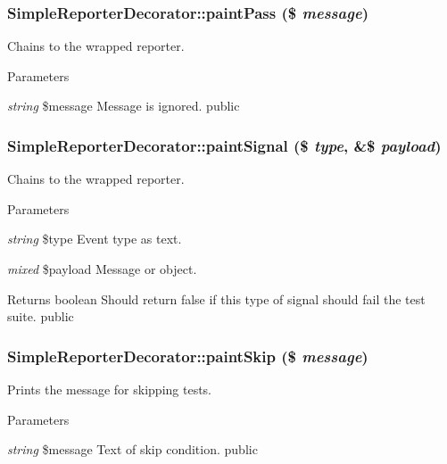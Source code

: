 \hypertarget{class_simple_reporter_decorator_a32a51a21a9b469e284a16b7b98430432}{
\subsubsection[{paintPass}]{\setlength{\rightskip}{0pt plus 5cm}SimpleReporterDecorator::paintPass (\$ {\em message})}}
\label{class_simple_reporter_decorator_a32a51a21a9b469e284a16b7b98430432}
Chains to the wrapped reporter. 
\begin{DoxyParams}{Parameters}
\item[{\em string}]\$message Message is ignored.  public \end{DoxyParams}
\hypertarget{class_simple_reporter_decorator_a94cd17c8d29e7a30fe8a37108d707fbd}{
\subsubsection[{paintSignal}]{\setlength{\rightskip}{0pt plus 5cm}SimpleReporterDecorator::paintSignal (\$ {\em type}, \/  \&\$ {\em payload})}}
\label{class_simple_reporter_decorator_a94cd17c8d29e7a30fe8a37108d707fbd}
Chains to the wrapped reporter. 
\begin{DoxyParams}{Parameters}
\item[{\em string}]\$type Event type as text. \item[{\em mixed}]\$payload Message or object. \end{DoxyParams}
\begin{DoxyReturn}{Returns}
boolean Should return false if this type of signal should fail the test suite.  public 
\end{DoxyReturn}
\hypertarget{class_simple_reporter_decorator_a40539ad16a5ce944fe4d2ea479bca897}{
\subsubsection[{paintSkip}]{\setlength{\rightskip}{0pt plus 5cm}SimpleReporterDecorator::paintSkip (\$ {\em message})}}
\label{class_simple_reporter_decorator_a40539ad16a5ce944fe4d2ea479bca897}
Prints the message for skipping tests. 
\begin{DoxyParams}{Parameters}
\item[{\em string}]\$message Text of skip condition.  public \end{DoxyParams}


